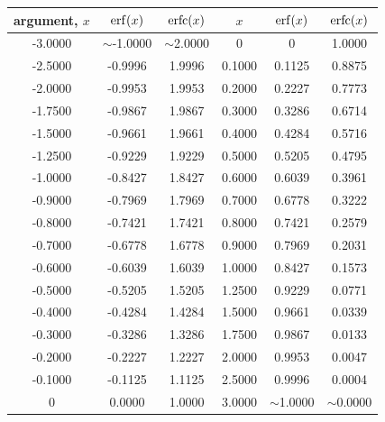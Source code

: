 \begin{center}
    \label{tab:erf}
    \begin{tabular}{@{}cccccc@{}}
        \toprule
        \textbf{argument}, $x$ & $\erf(x)$ & $\operatorname{erfc}(x)$ & $x$ & $\erf(x)$ & $\operatorname{erfc}(x)$ \\
        \midrule
        -3.0000 &  $\sim$-1.0000 &  $\sim$2.0000 &   0 &  0       &   1.0000 \\
        -2.5000 &  -0.9996 &   1.9996 &   0.1000  &  0.1125  &   0.8875 \\
        -2.0000 &  -0.9953 &   1.9953 &   0.2000  &  0.2227  &   0.7773 \\
        -1.7500 &  -0.9867 &   1.9867 &   0.3000  &  0.3286  &   0.6714 \\
        -1.5000 &  -0.9661 &   1.9661 &   0.4000  &  0.4284  &   0.5716 \\
        -1.2500 &  -0.9229 &   1.9229 &   0.5000  &  0.5205  &   0.4795 \\
        -1.0000 &  -0.8427 &   1.8427 &   0.6000  &  0.6039  &   0.3961 \\
        -0.9000 &  -0.7969 &   1.7969 &   0.7000  &  0.6778  &   0.3222 \\
        -0.8000 &  -0.7421 &   1.7421 &   0.8000  &  0.7421  &   0.2579 \\
        -0.7000 &  -0.6778 &   1.6778 &   0.9000  &  0.7969  &   0.2031 \\
        -0.6000 &  -0.6039 &   1.6039 &   1.0000  &  0.8427  &   0.1573 \\
        -0.5000 &  -0.5205 &   1.5205 &   1.2500  &  0.9229  &   0.0771 \\
        -0.4000 &  -0.4284 &   1.4284 &   1.5000  &  0.9661  &   0.0339 \\
        -0.3000 &  -0.3286 &   1.3286 &   1.7500  &  0.9867  &   0.0133 \\
        -0.2000 &  -0.2227 &   1.2227 &   2.0000  &  0.9953  &   0.0047 \\
        -0.1000 &  -0.1125 &   1.1125 &   2.5000  &  0.9996  &   0.0004 \\
        0       &  0.0000  &   1.0000 &   3.0000  &  $\sim$1.0000  &   $\sim$0.0000 \\
        \bottomrule
    \end{tabular}
\end{center}